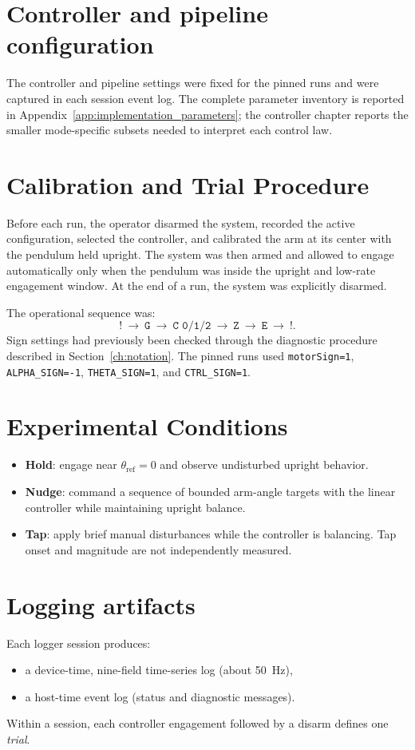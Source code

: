 
\section{Controller and pipeline configuration}
The controller and pipeline settings were fixed for the pinned runs and were
captured in each session event log. The complete parameter inventory is
reported in Appendix~\ref{app:implementation_parameters}; the controller
chapter reports the smaller mode-specific subsets needed to interpret each
control law.

\section{Calibration and Trial Procedure}
Before each run, the operator disarmed the system, recorded the active
configuration, selected the controller, and calibrated the arm at its center
with the pendulum held upright. The system was then armed and allowed to
engage automatically only when the pendulum was inside the upright and
low-rate engagement window. At the end of a run, the system was explicitly
disarmed.

The operational sequence was:
\[
\texttt{!}\ \rightarrow\ \texttt{G}\ \rightarrow\ \texttt{C 0/1/2}\
\rightarrow\ \texttt{Z}\ \rightarrow\ \texttt{E}\ \rightarrow\ \texttt{!}.
\]
Sign settings had previously been checked through the diagnostic procedure
described in Section~\ref{ch:notation}. The pinned runs used
\texttt{motorSign=1}, \texttt{ALPHA\_SIGN=-1},
\texttt{THETA\_SIGN=1}, and \texttt{CTRL\_SIGN=1}.

\section{Experimental Conditions}
\begin{itemize}
  \item \textbf{Hold}: engage near $\theta_{\mathrm{ref}}=0$ and observe
  undisturbed upright behavior.
  \item \textbf{Nudge}: command a sequence of bounded arm-angle targets with
  the linear controller while maintaining upright balance.
  \item \textbf{Tap}: apply brief manual disturbances while the controller is
  balancing. Tap onset and magnitude are not independently measured.
\end{itemize}

\section{Logging artifacts}
Each logger session produces:
\begin{itemize}
  \item a device-time, nine-field time-series log (about \SI{50}{Hz}),
  \item a host-time event log (status and diagnostic messages).
\end{itemize}
Within a session, each controller engagement followed by a disarm defines one \emph{trial}.

